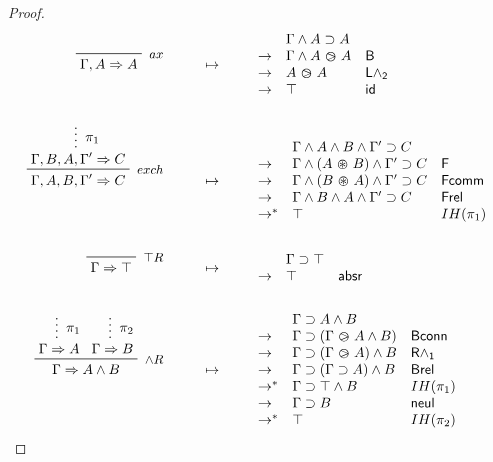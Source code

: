 \begin{proof}
  \begin{align*}
    \R[ax]
      {\Gamma, A \seq A}
    &\mt
    \begin{array}{lll}
            & \Gamma \land A \limp A & \\
      \step & \Gamma \land A \back A & \mathsf{B} \\
      \step & A \back A & \mathsf{L\land_2} \\
      \step & \top & \mathsf{id}
    \end{array}
    \\\\
    \R[exch]
      {\summ[$\pi_1$]{\Gamma, B, A, \Gamma' \seq C}}
      {\Gamma, A, B, \Gamma' \seq C}
    &\mt
    \begin{array}{lll}
            & \Gamma \land A \land B \land \Gamma' \limp C & \\
      \step & \Gamma \land (A \forw B) \land \Gamma' \limp C & \mathsf{F} \\
      \step & \Gamma \land (B \forw A) \land \Gamma' \limp C & \mathsf{Fcomm} \\
      \step & \Gamma \land B \land A \land \Gamma' \limp C & \mathsf{Frel} \\
      \steps & \top & IH(\pi_1)
    \end{array}
    \\\\
    \R[\top R]
      {}
      {\Gamma \seq \top}
    &\mt
    \begin{array}{lll}
            & \Gamma \limp \top & \\
      \step & \top & \mathsf{absr}
    \end{array}
    \\\\
    \R[\land R]
      {\summ[$\pi_1$]{\Gamma \seq A}}
      {\summ[$\pi_2$]{\Gamma \seq B}}
      {\Gamma \seq A \land B}
    &\mt
    \begin{array}{lll}
            & \Gamma \limp A \land B & \\
      \step & \Gamma \limp (\Gamma \back A \land B) & \mathsf{Bconn} \\
      \step & \Gamma \limp (\Gamma \back A) \land B & \mathsf{R\land_1} \\
      \step & \Gamma \limp (\Gamma \limp A) \land B & \mathsf{Brel} \\
      \steps & \Gamma \limp \top \land B & IH(\pi_1) \\
      \step & \Gamma \limp B & \mathsf{neul} \\
      \steps & \top & IH(\pi_2)

\end{array}
\end{align*}
\end{proof}

